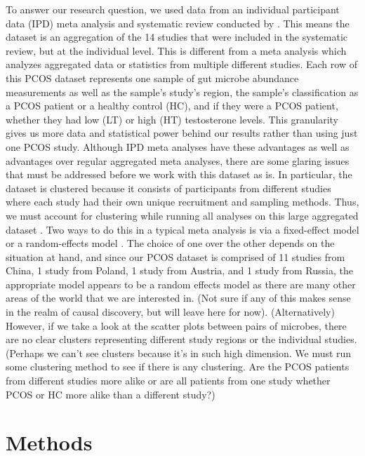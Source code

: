 \documentclass[12pt,letterpaper]{article}
\begin{document}
To answer our research question, we used data from an individual participant data (IPD) meta analysis and systematic review conducted by \citep{yang2024pcos}. This means the dataset is an aggregation of the 14 studies that were included in the systematic review, but at the individual level. This is different from a meta analysis which analyzes aggregated data or statistics from multiple different studies. Each row of this PCOS dataset represents one sample of gut microbe abundance measurements as well as the sample's study's region, the sample's classification as a PCOS patient or a healthy control (HC), and if they were a PCOS patient, whether they had low (LT) or high (HT) testosterone levels. This granularity gives us more data and statistical power behind our results rather than using just one PCOS study. Although IPD meta analyses have these advantages as well as advantages over regular aggregated meta analyses, there are some glaring issues that must be addressed before we work with this dataset as is. In particular, the dataset is clustered because it consists of participants from different studies where each study had their own unique recruitment and sampling methods. Thus, we must account for clustering while running all analyses on this large aggregated dataset \citep{riley2010ipdma}. Two ways to do this in a typical meta analysis is via a fixed-effect model or a random-effects model \citep{dettori2022fixedrandomeffect}. The choice of one over the other depends on the situation at hand, and since our PCOS dataset is comprised of 11 studies from China, 1 study from Poland, 1 study from Austria, and 1 study from Russia, the appropriate model appears to be a random effects model as there are many other areas of the world that we are interested in. (Not sure if any of this makes sense in the realm of causal discovery, but will leave here for now). (Alternatively) However, if we take a look at the scatter plots between pairs of microbes, there are no clear clusters representing different study regions or the individual studies. (Perhaps we can't see clusters because it's in such high dimension. We must run some clustering method to see if there is any clustering. Are the PCOS patients from different studies more alike or are all patients from one study whether PCOS or HC more alike than a different study?)

\section{Methods}
\end{document}
